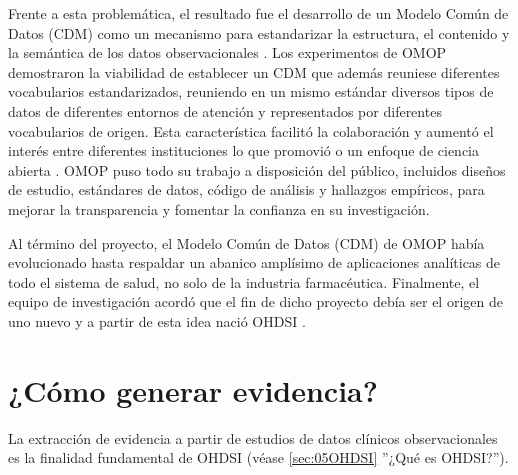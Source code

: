Frente a esta problemática, el resultado fue el desarrollo de un Modelo Común de Datos (CDM) como un mecanismo para estandarizar la estructura, el contenido y la semántica de los datos observacionales %
\parencite{overhage2012validation}. Los experimentos de OMOP demostraron la viabilidad de establecer un CDM que además reuniese diferentes vocabularios estandarizados, reuniendo en un mismo estándar diversos tipos de datos de diferentes entornos de atención y representados por diferentes vocabularios de origen. Esta característica facilitó la colaboración y aumentó el interés entre diferentes instituciones lo que promovió o un enfoque de ciencia abierta \parencite{OHDSIbook}. OMOP puso todo su trabajo a disposición del público, incluidos diseños de estudio, estándares de datos, código de análisis y hallazgos empíricos, para mejorar la transparencia y fomentar la confianza en su investigación. 

Al término del proyecto, el Modelo Común de Datos (CDM) de OMOP había evolucionado hasta respaldar un abanico  amplísimo de aplicaciones analíticas de todo el sistema de salud, no solo de la industria farmacéutica. Finalmente, el equipo de investigación acordó que el fin de dicho proyecto debía ser el origen de uno nuevo y a partir de esta idea nació OHDSI \parencite{OHDSIbook}.


\section{¿Cómo generar evidencia?} \label{sec:05Evidencia}

La extracción de evidencia a partir de estudios de datos clínicos observacionales es la finalidad fundamental de OHDSI (véase \ref{sec:05OHDSI} ''¿Qué es OHDSI?''). 



